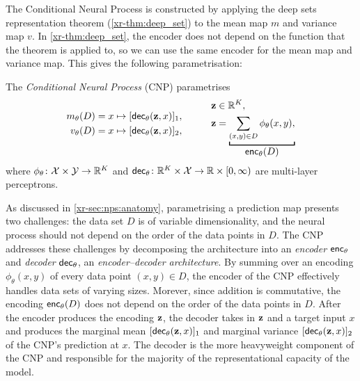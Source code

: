 \documentclass[12pt]{report}
\newcommand{\xrprefix}[1]{xr-#1}
\begin{document}
The Conditional Neural Process is constructed by applying the deep sets representation theorem (\cref{\xrprefix{thm:deep_set}}) to the mean map $m$ and variance map $v$.
In \cref{\xrprefix{thm:deep_set}}, the encoder does not depend on the function that the theorem is applied to, so we can use the same encoder for the mean map and variance map.
This gives the following parametrisation:

\begin{model}
    \label{mod:cnp}
    The \emph{Conditional Neural Process} (CNP) parametrises
    \begin{equation*}
        \begin{aligned}
            m_\theta(D) &= x \mapsto [\dec_\theta(\vz, x)]_1, \\
            v_\theta(D) &= x \mapsto [\dec_\theta(\vz, x)]_2, \\[1em]
        \end{aligned}
        \quad\qquad
        \begin{aligned}
            \vz &\in \R^K, \\
            \vz &= \underbracket[1pt]{
                \sum_{(x, y) \in D} \phi_\theta(x, y),
            }_{
                \displaystyle\enc_\theta(D)
            } \\
        \end{aligned}
    \end{equation*}
    where $\phi_\theta\colon \mathcal{X} \times \mathcal{Y} \to \mathbb{R}^K$ and  $\mathsf{dec}_\theta \colon \mathbb{R}^K \times \mathcal{X} \to \mathbb{R} \times [0, \infty)$ are multi-layer perceptrons.
\end{model}

As discussed in \cref{\xrprefix{sec:nps:anatomy}}, parametrising a prediction map presents two challenges:
the data set $D$ is of variable dimensionality,
and the neural process should not depend on the order of the data points in $D$.
The CNP addresses these challenges by decomposing the architecture into an \emph{encoder} $\mathsf{enc}_\theta$ and \emph{decoder} $\mathsf{dec}_\theta$, an \emph{encoder--decoder architecture}.
By summing over an encoding $\phi_\theta(x, y)$ of every data point $(x, y) \in D$, the encoder of the CNP effectively handles data sets of varying sizes.
Morever, since addition is commutative, the encoding $\mathsf{enc}_\theta(D)$ does not depend on the order of the data points in $D$.
After the encoder produces the encoding $\mathbf{z}$, the decoder takes in $\mathbf{z}$ and a target input $x$ and produces the marginal mean $[\mathsf{dec}_\theta(\mathbf{z},x)]_1$ and marginal variance $[\mathsf{dec}_\theta(\mathbf{z},x)]_2$ of the CNP's prediction at $x$.
The decoder is the more heavyweight component of the CNP and responsible for the majority of the representational capacity of the model.
\end{document}
